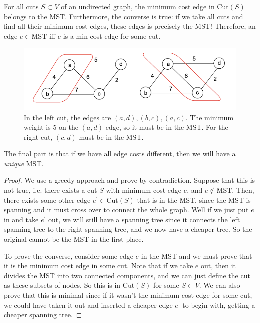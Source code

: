 \documentclass{article}
\begin{document}
      \begin{theorem}
        For all cuts $S \subset V$ of an undirected graph, the minimum cost edge in $\mathrm{Cut}(S)$ belongs to the MST. Furthermore, the converse is true: if we take all cuts and find all their minimum cost edges, these edges is precisely the MST! Therefore, an edge $e \in \mathrm{MST}$ iff $e$ is a min-cost edge for some cut. 
        \begin{figure}[H]
          \centering 
          \includegraphics[scale=0.4]{img/mst_cut_prop.png}
          \caption{In the left cut, the edges are $(a,d), (b, c), (a, c)$. The minimum weight is $5$ on the $(a, d)$ edge, so it must be in the MST. For the right cut, $(c, d)$ must be in the MST. } 
          \label{fig:mst_cut_prop}
        \end{figure}
        The final part is that if we have all edge costs different, then we will have a \textit{unique} MST. 
      \end{theorem}
      \begin{proof}
        We use a greedy approach and prove by contradiction. Suppose that this is not true, i.e. there exists a cut $S$ with minimum cost edge $e$, and $e \not\in \mathrm{MST}$. Then, there exists some other edge $e^\prime \in \mathrm{Cut}(S)$ that is in the MST, since the MST is spanning and it must cross over to connect the whole graph. Well if we just put $e$ in and take $e^\prime$ out, we will still have a spanning tree since it connects the left spanning tree to the right spanning tree, and we now have a cheaper tree. So the original cannot be the MST in the first place. 

        To prove the converse, consider some edge $e$ in the MST and we must prove that it is the minimum cost edge in some cut. Note that if we take $e$ out, then it divides the MST into two connected components, and we can just define the cut as these subsets of nodes. So this is in $\mathrm{Cut}(S)$ for some $S \subset V$. We can also prove that this is minimal since if it wasn't the minimum cost edge for some cut, we could have taken it out and inserted a cheaper edge $e^\prime$ to begin with, getting a cheaper spanning tree.   
      \end{proof}
\end{document}
